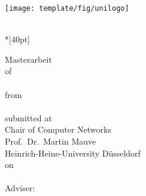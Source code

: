 \begin{titlepage}
	\centering
	\texttt{[image: template/fig/unilogo]}

	\vfill
	\Huge
	\thesistitle{}\\*[40pt]
	\normalsize

	\vfill
	\Large
	Masterarbeit\\[0.25em]
	\large
	of\\[5mm]
	\huge
	\thesisauthor{}\\

	\vspace{5mm}
	\large
	from \\ \thesisauthorbirthplace{}\\[1cm]
	submitted at \\[5mm]
		Chair of Computer Networks \\
		Prof.\ Dr.\ Martin Mauve \\
		Heinrich-Heine-University Düsseldorf\\[0.5cm]
	on \\
		\thesissubmissionmonth{} \thesissubmissionyear{} \\[0.5cm]
	Adviser:\\
	\thesissupervisor{}
\end{titlepage}

